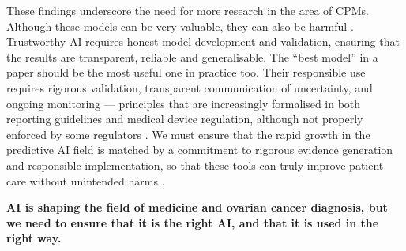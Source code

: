 These findings underscore the need for more research in the area of \glspl{CPM}. Although these models can be very valuable, they can also be harmful \cite{vancalsterCalibrationRiskPrediction2015}. Trustworthy AI requires honest model development and validation, ensuring that the results are transparent, reliable and generalisable. The \enquote{best model} in a paper should be the most useful one in practice too. Their responsible use requires rigorous validation, transparent communication of uncertainty, and ongoing monitoring --- principles that are increasingly formalised in both reporting guidelines and medical device regulation, although not properly enforced by some regulators \cite{mehtaEvaluatingTransparencyAI2025}. We must ensure that the rapid growth in the predictive AI field is matched by a commitment to rigorous evidence generation and responsible implementation, so that these tools can truly improve patient care without unintended harms \cite{ShowUsEvidence2026, goldenbergAIActuallyImproving2026}. 

\textbf{AI is shaping the field of medicine and ovarian cancer diagnosis, but we need to ensure that it is the right AI, and that it is used in the right way.}
